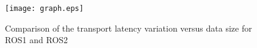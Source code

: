\documentclass{sig-alternate-ipsn13}
\begin{document}

\begin{figure}[t]
\begin{center}
\texttt{[image: graph.eps]}
\end{center}
\vspace{-8.mm}
\caption{Comparison of the transport latency variation versus data size for ROS1 and ROS2}
\vspace{-5.0mm}
\label{fig:graph}
\end{figure}



%
\vspace{-3.0mm}



%
%


\end{document}
